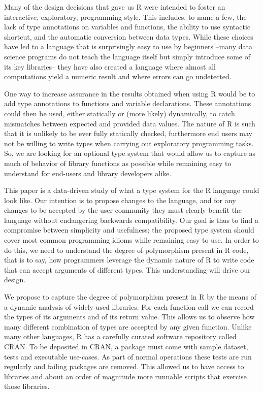 \documentclass[acmsmall,10pt,review,anonymous]{acmart}\settopmatter{printfolios=true,printccs=false,printacmref=false}
\begin{document}
Many of the design decisions that gave us R were intended to foster an
interactive, exploratory, programming style. This includes, to name a few,
the lack of type annotations on variables and functions, the ability to use
syntactic shortcut, and the automatic conversion between data types.  While
these choices have led to a language that is surprisingly easy to use by
beginners --many data science programs do not teach the language itself but
simply introduce some of its key libraries-- they have also created a
language where almost all computations yield a numeric result and where
errors can go undetected.

One way to increase assurance in the results obtained when using R would be
to add type annotations to functions and variable declarations. These
annotations could then be used, either statically or (more likely)
dynamically, to catch mismatches between expected and provided data values.
The nature of R is such that it is unlikely to be ever fully statically
checked, furthermore end users may not be willing to write types when
carrying out exploratory programming tasks. So, we are looking for an
optional type system that would allow us to capture as much of behavior of
library functions as possible while remaining easy to understand for
end-users and library developers alike.

This paper is a data-driven study of what a type system for the R language
could look like. Our intention is to propose changes to the
language, and for any changes to be accepted by the user community they
must clearly benefit the language without endangering backwards
compatibility. Our goal is thus to find a compromise between simplicity and
usefulness; the proposed type system should cover most common programming
idioms while remaining easy to use. In order to do this, we need to
understand the degree of polymorphism present in R code, that is to say, how
programmers leverage the dynamic nature of R to write code that can accept
arguments of different types.  This understanding will drive our design.

We propose to capture the degree of polymorphism present in R by the means
of a dynamic analysis of widely used libraries. For each function call we
can record the types of its arguments and of its return value. This allows
us to observe how many different combination of types are accepted by any
given function. Unlike many other languages, R has a carefully curated
software repository called CRAN. To be deposited in CRAN, a package must
come with sample dataset, tests and executable use-cases. As part of normal
operations these tests are run regularly and failing packages are removed.
This allowed us to have access to \PACKAGES libraries and about an order of
magnitude more runnable scripts that exercise those libraries.
\end{document}
